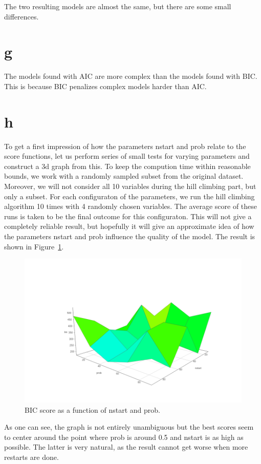 \documentclass[12pt]{article}
\theoremstyle{definition}
\begin{document}
The two resulting models are almost the same, but there are some small differences.

\section*{g}
The models found with AIC are more complex than the models found with BIC.
This is because BIC penalizes complex models harder than AIC.

\section*{h}
To get a first impression of how the parameters nstart and prob relate to the score functions,
let us perform series of small tests for varying parameters and construct a 3d graph from this.
To keep the compution time within reasonable bounds, we work with a randomly sampled subset
from the original dataset.
Moreover, we will not consider all 10 variables during the hill climbing part, but only a subset.
For each configuraton of the parameters, we run the hill climbing algorithm 10 times with 4
randomly chosen variables.
The average score of these runs is taken to be the final outcome for this configuraton.
This will not give a completely reliable result, but hopefully it will give an approximate
idea of how the parameters nstart and prob influence the quality of the model.
The result is shown in Figure~\ref{fig:rough}.

\begin{figure}[H]
    \centering
    \includegraphics[width=0.8\linewidth]{rough2.png}
    \caption{BIC score as a function of nstart and prob.}
\label{fig:rough}
\end{figure}

As one can see, the graph is not entirely unambiguous but the best scores seem to
center around the point where prob is around 0.5 and nstart is as high as possible.
The latter is very natural, as the result cannot get worse when more restarts are done.
\end{document}
